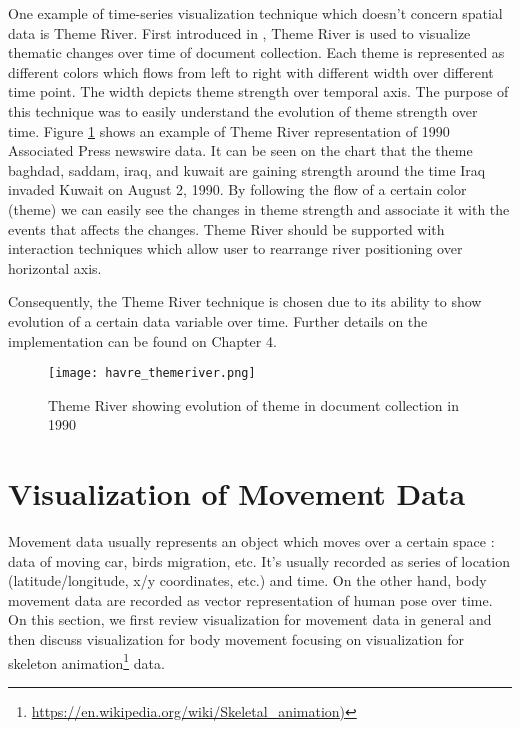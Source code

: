 One example of time-series visualization technique which doesn't concern spatial data is Theme River. First introduced in \cite{havre}, Theme River is used to visualize thematic changes over time of document collection. Each theme is represented as different colors which flows from left to right with different width over different time point. The width depicts theme strength over temporal axis. The purpose of this technique was to easily understand the evolution of theme strength over time. Figure \ref{themeriver} shows an example of Theme River representation of 1990 Associated Press newswire data. It can be seen on the chart that the theme baghdad, saddam, iraq, and kuwait are gaining strength  around the time Iraq invaded Kuwait on August 2, 1990. By following the flow of a certain color (theme) we can easily see the changes in theme strength and associate it with the events that affects the changes. Theme River should be supported with interaction techniques which allow user to rearrange river positioning over horizontal axis. 

Consequently, the Theme River technique is chosen due to its ability to show evolution of a certain data variable over time. Further details on the implementation can be found on Chapter 4.

\begin{figure}
\centering
\texttt{[image: havre\_themeriver.png]}
\caption{Theme River showing evolution of theme in document collection in 1990}
\label{themeriver}
\end{figure}


\section{Visualization of Movement Data}

Movement data usually represents an object which moves over a certain space \cite{adrienko_book}: data of moving car, birds migration, etc. It's usually recorded as series of location (latitude/longitude, x/y coordinates, etc.) and time. On the other hand, body movement data are recorded as vector representation of human pose \cite{bernard2013} over time. On this section, we first review visualization for movement data in general and then discuss visualization for body movement focusing on visualization for skeleton animation\footnote{\url{https://en.wikipedia.org/wiki/Skeletal_animation)}} data.

